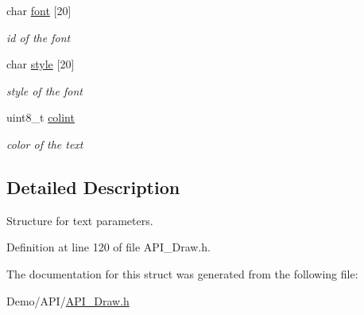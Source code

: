 \begin{DoxyCompactItemize}
\mbox{\label{struct_t_e_x_t_a333e02dd657fb6d02f928075a9ed9119}} 
char \hyperlink{struct_t_e_x_t_a333e02dd657fb6d02f928075a9ed9119}{font} \mbox{[}20\mbox{]}
\begin{DoxyCompactList}\small\item\em id of the font \end{DoxyCompactList}\item 
\mbox{\label{struct_t_e_x_t_a34df1ac1fb51661ced6c422e491bf638}} 
char \hyperlink{struct_t_e_x_t_a34df1ac1fb51661ced6c422e491bf638}{style} \mbox{[}20\mbox{]}
\begin{DoxyCompactList}\small\item\em style of the font \end{DoxyCompactList}\item 
\mbox{\label{struct_t_e_x_t_a21caa4b27a71b7967f1a2d64f196a674}} 
uint8\+\_\+t \hyperlink{struct_t_e_x_t_a21caa4b27a71b7967f1a2d64f196a674}{colint}
\begin{DoxyCompactList}\small\item\em color of the text \end{DoxyCompactList}\end{DoxyCompactItemize}


\subsection{Detailed Description}
Structure for text parameters. 

Definition at line 120 of file A\+P\+I\+\_\+\+Draw.\+h.



The documentation for this struct was generated from the following file\+:\begin{DoxyCompactItemize}
\item 
Demo/\+A\+P\+I/\hyperlink{_a_p_i___draw_8h}{A\+P\+I\+\_\+\+Draw.\+h}\end{DoxyCompactItemize}

